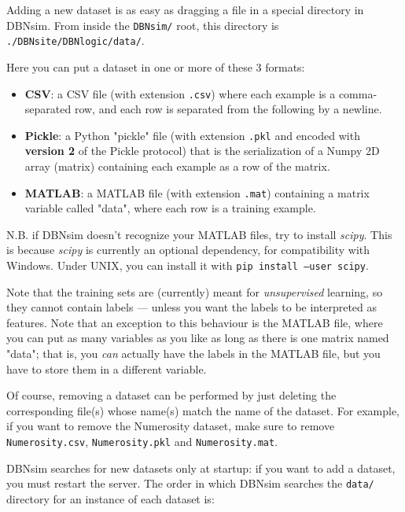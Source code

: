 \documentclass[a4paper]{article}
\begin{document}
		
Adding a new dataset is as easy as dragging a file in a special directory in DBNsim. From inside the \texttt{DBNsim/} root, this directory is \texttt{./DBNsite/DBNlogic/data/}.
		
Here you can put a dataset in one or more of these 3 formats:
		
	\begin{itemize}
		
			
	\item \textbf{CSV}: a CSV file (with extension \texttt{.csv}) where each example is a comma-separated row, and each row is separated from the following by a newline.
			
	\item \textbf{Pickle}: a Python "pickle" file (with extension \texttt{.pkl} and encoded with \textbf{version 2} of the Pickle protocol) that is the serialization of a Numpy 2D array (matrix) containing each example as a row of the matrix.
			
	\item \textbf{MATLAB}: a MATLAB file (with extension \texttt{.mat}) containing a matrix variable called "data", where each row is a training example.
		
	\end{itemize}

		
N.B. if DBNsim doesn't recognize your MATLAB files, try to install \emph{scipy}. This is because \emph{scipy} is currently an optional dependency, for compatibility with Windows. Under UNIX, you can install it with \texttt{pip install --user scipy}.
		
Note that the training sets are (currently) meant for \emph{unsupervised} learning, so they cannot contain labels --- unless you want the labels to be interpreted as features. Note that an exception to this behaviour is the MATLAB file, where you can put as many variables as you like as long as there is one matrix named "data"; that is, you \emph{can} actually have the labels in the MATLAB file, but you have to store them in a different variable.
		
Of course, removing a dataset can be performed by just deleting the corresponding file(s) whose name(s) match the name of the dataset. For example, if you want to remove the Numerosity dataset, make sure to remove \texttt{Numerosity.csv}, \texttt{Numerosity.pkl} and \texttt{Numerosity.mat}.
		
DBNsim searches for new datasets only at startup: if you want to add a dataset, you must restart the server. The order in which DBNsim searches the \texttt{data/} directory for an instance of each dataset is:
		
\end{document}

